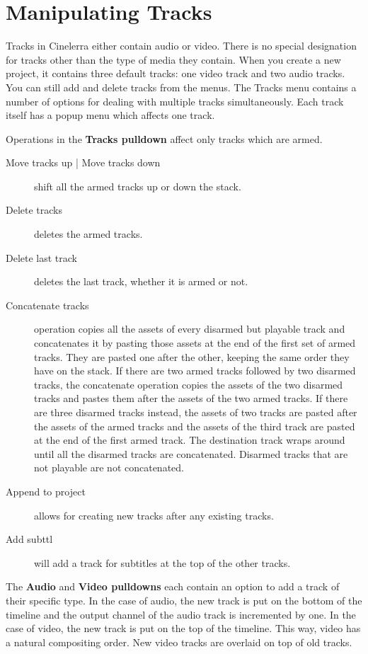 \section{Manipulating Tracks}%
\label{sec:manipulating_tracks}

Tracks in Cinelerra either contain audio or video.  There is no special designation for tracks other than the type of media they contain.  When you create a new project, it contains three default tracks: one video track and two audio tracks.  You can still add and delete tracks from the menus.  The Tracks menu contains a number of options for dealing with multiple tracks simultaneously.  Each track itself has a popup menu which affects one track. 

Operations in the \textbf{Tracks pulldown} affect only tracks which are armed.

\begin{description}
    \item[Move tracks up | Move tracks down] shift all the armed tracks up or down the stack.
    \item[Delete tracks] deletes the armed tracks.
    \item[Delete last track] deletes the last track, whether it is armed or not.
    \item[Concatenate tracks] operation copies all the assets of every disarmed but playable track and concatenates it by pasting those assets at the end of the first set of armed tracks. They are pasted one after the other, keeping the same order they have on the stack. If there are two armed tracks followed by two disarmed tracks, the concatenate operation copies the assets of the two disarmed tracks and pastes them after the assets of the two armed tracks. If there are three disarmed tracks instead, the assets of two tracks are pasted after the assets of the armed tracks and the assets of the third track are pasted at the end of the first armed track. The destination track wraps around until all the disarmed tracks are concatenated. Disarmed tracks that are not playable are not concatenated.
    \item[Append to project] allows for creating new tracks after any existing tracks.
    \item[Add subttl] will add a track for subtitles at the top of the other tracks.
\end{description}

The \textbf{Audio} and \textbf{Video pulldowns} each contain an option to add a track of their specific type. In the case of audio, the new track is put on the bottom of the timeline and the output channel of the audio track is incremented by one. In the case of video, the new track is put on the top of the timeline. This way, video has a natural compositing order. New video tracks are overlaid on top of old tracks.

